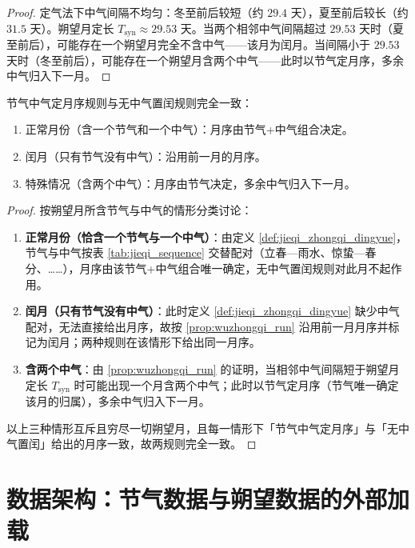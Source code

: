 \begin{proof}
定气法下中气间隔不均匀：冬至前后较短（约 \(29.4\) 天），夏至前后较长（约 \(31.5\) 天）。朔望月定长 \(T_{\text{syn}}\approx 29.53\) 天。当两个相邻中气间隔超过 \(29.53\) 天时（夏至前后），可能存在一个朔望月完全不含中气——该月为闰月。当间隔小于 \(29.53\) 天时（冬至前后），可能存在一个朔望月含两个中气——此时以节气定月序，多余中气归入下一月。
\end{proof}

\begin{proposition}[节气中气定月序与无中气置闰的一致性]\label{prop:dingyue_consistency}
节气中气定月序规则与无中气置闰规则完全一致：
\begin{enumerate}[label=(\roman*)]
    \item 正常月份（含一个节气和一个中气）：月序由节气+中气组合决定。
    \item 闰月（只有节气没有中气）：沿用前一月的月序。
    \item 特殊情况（含两个中气）：月序由节气决定，多余中气归入下一月。
\end{enumerate}
\end{proposition}

\begin{proof}
按朔望月所含节气与中气的情形分类讨论：
\begin{enumerate}[label=(\roman*)]
\item \textbf{正常月份（恰含一个节气与一个中气）}：由定义 \ref{def:jieqi_zhongqi_dingyue}，节气与中气按表 \ref{tab:jieqi_sequence} 交替配对（立春—雨水、惊蛰—春分、……），月序由该节气+中气组合唯一确定，无中气置闰规则对此月不起作用。
\item \textbf{闰月（只有节气没有中气）}：此时定义 \ref{def:jieqi_zhongqi_dingyue} 缺少中气配对，无法直接给出月序，故按 \cref{prop:wuzhongqi_run} 沿用前一月月序并标记为闰月；两种规则在该情形下给出同一月序。
\item \textbf{含两个中气}：由 \cref{prop:wuzhongqi_run} 的证明，当相邻中气间隔短于朔望月定长 \(T_{\text{syn}}\) 时可能出现一个月含两个中气；此时以节气定月序（节气唯一确定该月的归属），多余中气归入下一月。
\end{enumerate}
以上三种情形互斥且穷尽一切朔望月，且每一情形下「节气中气定月序」与「无中气置闰」给出的月序一致，故两规则完全一致。
\end{proof}

\section{数据架构：节气数据与朔望数据的外部加载}
\label{sec:calendar_data_architecture}

